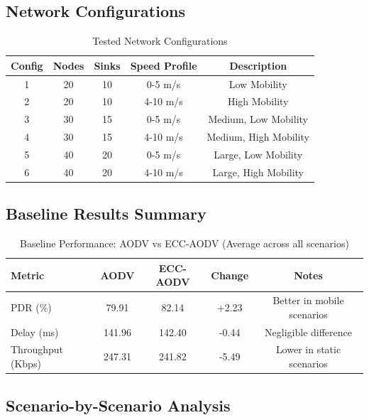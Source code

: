 \documentclass[11pt,a4paper]{article}
\begin{document}
\subsection{Network Configurations}

\begin{table}[H]
\centering
\caption{Tested Network Configurations}
\begin{tabular}{ccccc}
\toprule
\textbf{Config} & \textbf{Nodes} & \textbf{Sinks} & \textbf{Speed Profile} & \textbf{Description} \\
\midrule
1 & 20 & 10 & 0-5 m/s & Low Mobility \\
2 & 20 & 10 & 4-10 m/s & High Mobility \\
3 & 30 & 15 & 0-5 m/s & Medium, Low Mobility \\
4 & 30 & 15 & 4-10 m/s & Medium, High Mobility \\
5 & 40 & 20 & 0-5 m/s & Large, Low Mobility \\
6 & 40 & 20 & 4-10 m/s & Large, High Mobility \\
\bottomrule
\end{tabular}
\end{table}

\subsection{Baseline Results Summary}

\begin{table}[H]
\centering
\caption{Baseline Performance: AODV vs ECC-AODV (Average across all scenarios)}
\begin{tabular}{lcccc}
\toprule
\textbf{Metric} & \textbf{AODV} & \textbf{ECC-AODV} & \textbf{Change} & \textbf{Notes} \\
\midrule
PDR (\%) & 79.91 & 82.14 & +2.23 & Better in mobile scenarios \\
Delay (ms) & 141.96 & 142.40 & -0.44 & Negligible difference \\
Throughput (Kbps) & 247.31 & 241.82 & -5.49 & Lower in static scenarios \\
\bottomrule
\end{tabular}
\end{table}

\subsection{Scenario-by-Scenario Analysis}
\end{document}
